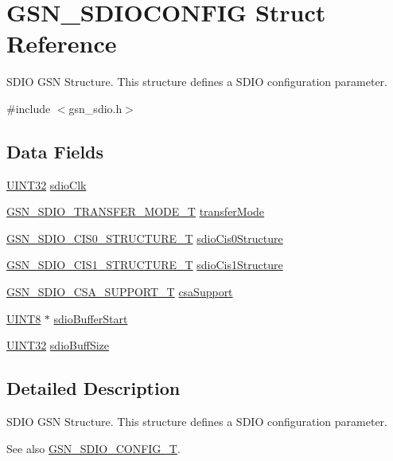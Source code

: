 \hypertarget{a00226}{
\section{GSN\_\-SDIOCONFIG Struct Reference}
\label{a00226}
}


SDIO GSN Structure. This structure defines a SDIO configuration parameter.  




{\ttfamily \#include $<$gsn\_\-sdio.h$>$}

\subsection*{Data Fields}
\begin{DoxyCompactItemize}
\item 
\hyperlink{a00660_gae1e6edbbc26d6fbc71a90190d0266018}{UINT32} \hyperlink{a00226_a9bb0a1a9e7230a7a5933d66df575e742}{sdioClk}
\item 
\hyperlink{a00653_gab2867e08a941d7ecdca09fd9cbeff66c}{GSN\_\-SDIO\_\-TRANSFER\_\-MODE\_\-T} \hyperlink{a00226_a87b2b2e6e271e18c41ed8104964dc1b7}{transferMode}
\item 
\hyperlink{a00217}{GSN\_\-SDIO\_\-CIS0\_\-STRUCTURE\_\-T} \hyperlink{a00226_a0bf26a6eea35d59f303591cd6501afa0}{sdioCis0Structure}
\item 
\hyperlink{a00218}{GSN\_\-SDIO\_\-CIS1\_\-STRUCTURE\_\-T} \hyperlink{a00226_af0ecceae9290e2a184c9f8a9b7b98240}{sdioCis1Structure}
\item 
\hyperlink{a00653_ga0b8def9125739921da58093450df058e}{GSN\_\-SDIO\_\-CSA\_\-SUPPORT\_\-T} \hyperlink{a00226_a4bbd188d8ec8abec6fc23bb193fd9424}{csaSupport}
\item 
\hyperlink{a00660_gab27e9918b538ce9d8ca692479b375b6a}{UINT8} $\ast$ \hyperlink{a00226_a449e4955b6dc1e05ba6b00e90ba4221b}{sdioBufferStart}
\item 
\hyperlink{a00660_gae1e6edbbc26d6fbc71a90190d0266018}{UINT32} \hyperlink{a00226_ad8a0bf8777517ff38b32e8a32c02b64d}{sdioBuffSize}
\end{DoxyCompactItemize}


\subsection{Detailed Description}
SDIO GSN Structure. This structure defines a SDIO configuration parameter. 

\begin{DoxySeeAlso}{See also}
\hyperlink{a00653_ga741fda4dc2cd93143a8a73ddaace7de8}{GSN\_\-SDIO\_\-CONFIG\_\-T}. 
\end{DoxySeeAlso}


